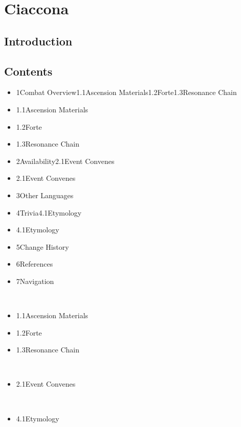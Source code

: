\documentclass[a4paper,12pt]{article}
\begin{document}
\section*{ Ciaccona}

\subsection*{Introduction}\n\n\subsection*{Contents}\n\n\begin{itemize}
\item 1Combat Overview1.1Ascension Materials1.2Forte1.3Resonance Chain
\item 1.1Ascension Materials
\item 1.2Forte
\item 1.3Resonance Chain
\item 2Availability2.1Event Convenes
\item 2.1Event Convenes
\item 3Other Languages
\item 4Trivia4.1Etymology
\item 4.1Etymology
\item 5Change History
\item 6References
\item 7Navigation
\end{itemize}\\ \par \vspace{0.5cm}

\begin{itemize}
\item 1.1Ascension Materials
\item 1.2Forte
\item 1.3Resonance Chain
\end{itemize}\\ \par \vspace{0.5cm}

\begin{itemize}
\item 2.1Event Convenes
\end{itemize}\\ \par \vspace{0.5cm}

\begin{itemize}
\item 4.1Etymology
\end{itemize}\\ \par \vspace{0.5cm}
\end{document}
